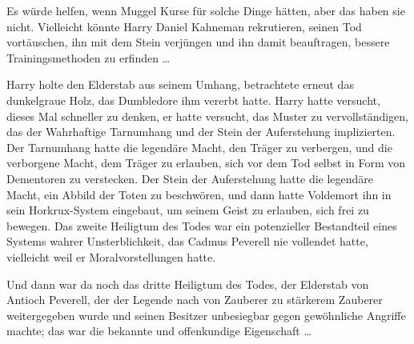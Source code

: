 Es würde helfen, wenn Muggel Kurse für solche Dinge hätten, aber das haben sie nicht.
Vielleicht könnte Harry Daniel Kahneman rekrutieren, seinen Tod vortäuschen, ihn mit dem Stein verjüngen und ihn damit beauftragen, bessere Trainingsmethoden zu erfinden …

Harry holte den Elderstab aus seinem Umhang, betrachtete erneut das dunkelgraue Holz, das Dumbledore ihm vererbt hatte. Harry hatte versucht, dieses Mal schneller zu denken, er hatte versucht, das Muster zu vervollständigen, das der Wahrhaftige Tarnumhang und der Stein der Auferstehung implizierten. Der Tarnumhang hatte die legendäre Macht, den Träger zu verbergen, und die verborgene Macht, dem Träger zu erlauben, sich vor dem Tod selbst in Form von Dementoren zu verstecken. Der Stein der Auferstehung hatte die legendäre Macht, ein Abbild der Toten zu beschwören, und dann hatte Voldemort ihn in sein Horkrux-System eingebaut, um seinem Geist zu erlauben, sich frei zu bewegen. Das zweite Heiligtum des Todes war ein potenzieller Bestandteil eines Systems wahrer Unsterblichkeit, das Cadmus Peverell nie vollendet hatte, vielleicht weil er Moralvorstellungen hatte.

Und dann war da noch das dritte Heiligtum des Todes, der Elderstab von Antioch Peverell, der der Legende nach von Zauberer zu stärkerem Zauberer weitergegeben wurde und seinen Besitzer unbesiegbar gegen gewöhnliche Angriffe machte; das war die bekannte und offenkundige Eigenschaft …

